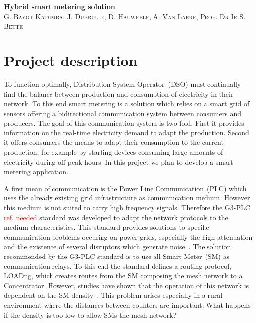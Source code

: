 \documentclass[a4paper,10pt]{article}
\newcommand{\FIXME}[1]{\textcolor{red}{\framebox{FIXME:} #1}}
\begin{document}

\begin{center}
  \huge\textbf{Hybrid smart metering solution}\\
  \vspace{0.5em}
  \small\textsc{G. Bayot Katumba, J. Dubrulle, D. Hauweele, A. Van Laere, Prof. Dr Ir S. Bette}
\end{center}

\section{Project description}

To function optimally, Distribution System Operator~(DSO)
must continually find the balance between production and
consumption of electricity in their network. To this end
smart metering is a solution which relies on a smart grid of
sensors offering a bidirectional communication system
between consumers and producers. The goal of this
communication system is two-fold. First it provides
information on the real-time electricity demand to adapt the
production. Second it offers consumers the means to adapt
their consumption to the current production, for example by
starting devices consuming large amounts of electricity
during off-peak hours. In this project we plan to develop a
smart metering application.

A first mean of communication is the Power Line
Communication~(PLC) which uses the already existing grid
infrastructure as communication medium. However this medium
is not suited to carry high frequency signals. Therefore the
G3-PLC\FIXME{ref. needed} standard was developed to adapt
the network protocols to the medium characteristics. This
standard provides solutions to specific communication
problems occuring on power grids, especially the high
attenuation and the existence of several disruptors which
generate noise~\cite{itu_sim2016}. The solution recommended
by the G3-PLC standard is to use all Smart Meter~(SM) as
communication relays. To this end the standard defines a
routing protocol, LOADng, which creates routes from the SM
composing the mesh network to a Concentrator. However,
studies have shown that the operation of this network is
dependent on the SM density~\cite{g3plc_density2015}. This
problem arises especially in a rural environment where the
distances between counters are important. What happens if
the density is too low to allow SMs the mesh network?
\end{document}
